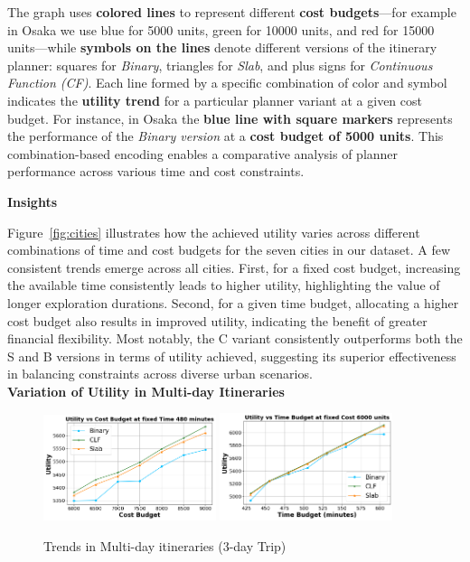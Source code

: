 \noindent The graph uses \textbf{colored lines} to represent different \textbf{cost budgets}—for example in Osaka we use blue for 5000 units, green for 10000 units, and red for 15000 units—while \textbf{symbols on the lines} denote different versions of the itinerary planner: squares for \textit{Binary}, triangles for \textit{Slab}, and plus signs for \textit{Continuous Function (CF)}. Each line formed by a specific combination of color and symbol indicates the \textbf{utility trend} for a particular planner variant at a given cost budget. For instance, in Osaka the \textbf{blue line with square markers} represents the performance of the \textit{Binary version} at a \textbf{cost budget of 5000 units}. This combination-based encoding enables a comparative analysis of planner performance across various time and cost constraints.

\noindent\textbf{Insights}

\noindent Figure~\ref{fig:cities} illustrates how the achieved utility varies across different combinations of time and cost budgets for the seven cities in our dataset. A few consistent trends emerge across all cities. First, for a fixed cost budget, increasing the available time consistently leads to higher utility, highlighting the value of longer exploration durations. Second, for a given time budget, allocating a higher cost budget also results in improved utility, indicating the benefit of greater financial flexibility. Most notably, the C variant consistently outperforms both the S and B versions in terms of utility achieved, suggesting its superior effectiveness in balancing constraints across diverse urban scenarios.\\

\noindent\textbf{Variation of Utility in Multi-day Itineraries}
\begin{figure}[th]
\includegraphics[width=0.45\textwidth]{plots/multiday1_pkj.png}
\includegraphics[width=0.45\textwidth]{plots/multiday2_pkj.png}
\caption{Trends in Multi-day itineraries (3-day Trip)}
\label{fig:util_md}
\end{figure}

